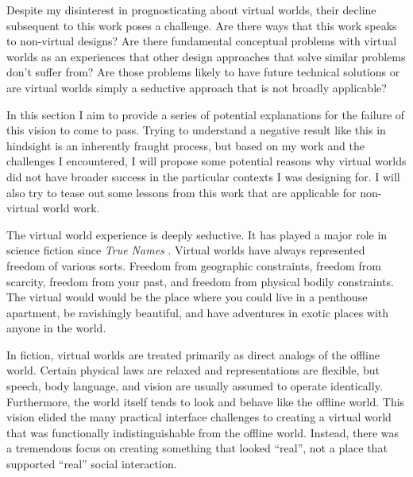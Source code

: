 Despite my disinterest in prognosticating about virtual worlds, their decline subsequent to this work poses a challenge. Are there ways that this work speaks to non-virtual designs? Are there fundamental conceptual problems with virtual worlds as an experiences that other design approaches that solve similar problems don't suffer from? Are those problems likely to have future technical solutions or are virtual worlds simply a seductive approach that is not broadly applicable?

In this section I aim to provide a series of potential explanations for the failure of this vision to come to pass. Trying to understand a negative result like this in hindsight is an inherently fraught process, but based on my work and the challenges I encountered, I will propose some potential reasons why virtual worlds did not have broader success in the particular contexts I was designing for. I will also try to tease out some lessons from this work that are applicable for non-virtual world work.


The virtual world experience is deeply seductive. It has played a major role in science fiction since \emph{True Names} \citep{Vinge:1987ty}. Virtual worlds have always represented freedom of various sorts. Freedom from geographic constraints, freedom from scarcity, freedom from your past, and freedom from physical bodily constraints. The virtual would would be the place where you could live in a penthouse apartment, be ravishingly beautiful, and have adventures in exotic places with anyone in the world. 

In fiction, virtual worlds are treated primarily as direct analogs of the offline world. Certain physical laws are relaxed and representations are flexible, but speech, body language, and vision are usually assumed to operate identically. Furthermore, the world itself tends to look and behave like the offline world.  This vision elided the many practical interface challenges to creating a virtual world that was functionally indistinguishable from the offline world. Instead, there was a tremendous focus on creating something that looked ``real'', not a place that supported ``real'' social interaction. 

